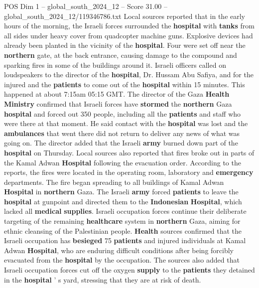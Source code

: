 \begin{textsample}{POS Dim 1 – global\_south\_2024\_12 – Score 31.00 – global\_south\_2024\_12/119346786.txt}  \label{ex:f1_pos_108}
Local sources reported that in the early hours of the morning, the Israeli forces surrounded the \textbf{hospital} with \textbf{tanks} from all sides under heavy cover from quadcopter machine guns.
Explosive devices had already been planted in the vicinity of the \textbf{hospital}.
Four were set off near the \textbf{northern} gate, at the back entrance, causing damage to the compound and sparking fires in some of the buildings around it.
Israeli officers called on loudspeakers to the director of the \textbf{hospital}, Dr.
Hussam Abu Safiya, and for the injured and the \textbf{patients} to come out of the \textbf{hospital} within 15 minutes.
This happened at about 7:15am 05:15 GMT.
The director of the Gaza \textbf{Health} \textbf{Ministry} confirmed that Israeli forces have \textbf{stormed} the \textbf{northern} Gaza \textbf{hospital} and forced out 350 people, including all the \textbf{patients} and staff who were there at that moment.
He said contact with the \textbf{hospital} was lost and the \textbf{ambulances} that went there did not return to deliver any news of what was going on.
The director added that the Israeli \textbf{army} burned down part of the \textbf{hospital} on Thursday.
Local sources also reported that fires broke out in parts of the Kamal Adwan \textbf{Hospital} following the evacuation order.
According to the reports, the fires were located in the operating room, laboratory and \textbf{emergency} departments.
The fire began spreading to all buildings of Kamal Adwan \textbf{Hospital} in \textbf{northern} Gaza.
The Israeli \textbf{army} forced \textbf{patients} to leave the \textbf{hospital} at gunpoint and directed them to the \textbf{Indonesian} \textbf{Hospital}, which lacked all \textbf{medical} \textbf{supplies}.
Israeli occupation forces continue their deliberate targeting of the remaining \textbf{healthcare} system in \textbf{northern} Gaza, aiming for ethnic cleansing of the Palestinian people. \textbf{Health} sources confirmed that the Israeli occupation has \textbf{besieged} 75 \textbf{patients} and injured individuals at Kamal Adwan \textbf{Hospital}, who are enduring difficult conditions after being forcibly evacuated from the \textbf{hospital} by the occupation.
The sources also added that Israeli occupation forces cut off the oxygen \textbf{supply} to the \textbf{patients} they detained in the \textbf{hospital} ' s yard, stressing that they are at risk of death.

\end{textsample}

